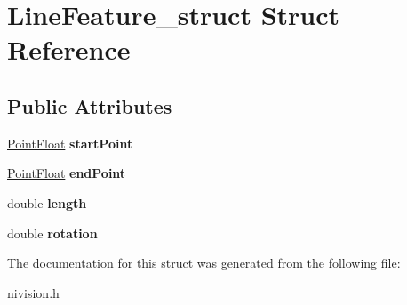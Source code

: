 \hypertarget{structLineFeature__struct}{
\section{LineFeature\_\-struct Struct Reference}
\label{structLineFeature__struct}
}
\subsection*{Public Attributes}
\begin{DoxyCompactItemize}
\item 
\hypertarget{structLineFeature__struct_acab0c0040a4b139c6f56a5f047e37306}{
\hyperlink{structPointFloat__struct}{PointFloat} {\bfseries startPoint}}
\label{structLineFeature__struct_acab0c0040a4b139c6f56a5f047e37306}

\item 
\hypertarget{structLineFeature__struct_aeefc7a3dd4ceae11235ef841c94195b7}{
\hyperlink{structPointFloat__struct}{PointFloat} {\bfseries endPoint}}
\label{structLineFeature__struct_aeefc7a3dd4ceae11235ef841c94195b7}

\item 
\hypertarget{structLineFeature__struct_aaa9b0b4ead3d7c4b23a54db51935ca30}{
double {\bfseries length}}
\label{structLineFeature__struct_aaa9b0b4ead3d7c4b23a54db51935ca30}

\item 
\hypertarget{structLineFeature__struct_a90d68e8e52c6dc755bb95cd572674057}{
double {\bfseries rotation}}
\label{structLineFeature__struct_a90d68e8e52c6dc755bb95cd572674057}

\end{DoxyCompactItemize}


The documentation for this struct was generated from the following file:\begin{DoxyCompactItemize}
\item 
nivision.h\end{DoxyCompactItemize}
